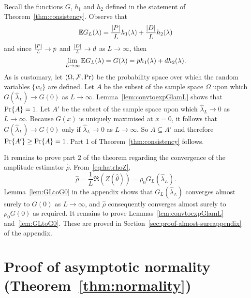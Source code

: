 \documentclass[journal]{IEEEtran}
\begin{document}
Recall the functions $G$, $h_1$ and $h_2$ defined in the statement of Theorem~\ref{thm:consistency}.  Observe that
\[
{\mathbb E} G_L(\lambda) = \frac{{\left\vert P \right\vert}}{L} h_1(\lambda) + \frac{{\left\vert D \right\vert}}{L} h_2(\lambda)
\]
and since $\frac{{\left\vert P \right\vert}}{L} \rightarrow p$ and $\frac{{\left\vert D \right\vert}}{L} \rightarrow d$ as $L \rightarrow \infty$, then
\[
\lim_{L \rightarrow\infty} {\mathbb E} G_L(\lambda) = G(\lambda) = p h_1(\lambda)   +  d h_2(\lambda).
\]
As is customary, let $(\Omega, \mathcal F, {\operatorname{Pr}})$ be the probability space over which the random variables $\{w_i\}$ are defined.  Let $A$ be the subset of the sample space $\Omega$ upon which $G(\hat{\lambda}_L) \rightarrow G(0)$ as $L\rightarrow\infty$.  Lemma~\ref{lem:convtoexpGlamL} shows that ${\operatorname{Pr}}\{A\} = 1$.  Let $A'$ be the subset of the sample space upon which $\hat{\lambda}_L \rightarrow 0$ as $L\rightarrow \infty$.  Because $G(x)$ is uniquely maximised at $x=0$, it follows that $G(\hat{\lambda}_L) \rightarrow G(0)$ only if $\hat{\lambda}_L \rightarrow 0$ as $L \rightarrow\infty$. So $A \subseteq A'$ and therefore ${\operatorname{Pr}}\{A'\} \geq {\operatorname{Pr}}\{A\} = 1$.  Part 1 of Theorem~\ref{thm:consistency} follows.  

It remains to prove part 2 of the theorem regarding the convergence of the amplitude estimator $\hat{\rho}$.  From~\eqref{eq:hatrhoZ},
\begin{equation}\label{eq:rhoGLZ}
\hat{\rho} = \frac{1}{L}\Re(Z(\hat{\theta})) = \rho_0 G_L(\hat{\lambda}_L).
\end{equation}  
Lemma~\ref{lem:GLtoG0} in the appendix shows that $G_L(\hat{\lambda}_L)$ converges almost surely to $G(0)$ as $L\rightarrow\infty$, and $\hat{\rho}$ consequently converges almost surely to $\rho_0 G(0)$ as required.  It remains to prove Lemmas~\ref{lem:convtoexpGlamL} and~\ref{lem:GLtoG0}.  These are proved in Section~\ref{sec:proof-almost-sureappendix} of the appendix.

\section{Proof of asymptotic normality (Theorem~\ref{thm:normality}) } \label{sec:proof-asympt-norm}
\end{document}
